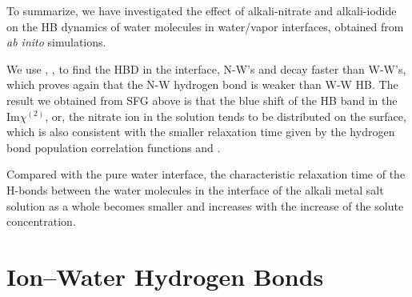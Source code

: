 To summarize, we have investigated the effect of alkali-nitrate and alkali-iodide on the HB dynamics
of water molecules in water/vapor interfaces, obtained from \emph{ab inito} simulations. 

We use \CHB, \SHB, to find the HBD in the interface, N-W's \CHB and \SHB decay faster than W-W's, 
which proves again that the N-W hydrogen bond is weaker than W-W HB. 
The result we obtained from SFG above is that the blue shift of the HB band in the Im$\chi^{(2)}$, or, the nitrate ion in the solution tends to be distributed on the surface, 
which is also consistent with the smaller relaxation time given by the hydrogen bond population correlation functions \CHB and \SHB.

Compared with the pure water interface, the characteristic relaxation time of the H-bonds between the water molecules 
in the interface of the alkali metal salt solution as a whole becomes smaller and increases with the increase of the solute concentration.
\section{Ion--Water Hydrogen Bonds}
%


